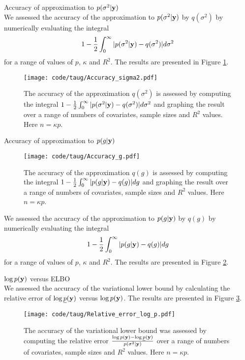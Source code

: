 \documentclass{amsart}[12pt]
\begin{document}
Accuracy of approximation to $p(\sigma^2 | {\bf y})$ \\

We assessed the accuracy of the approximation to $p(\sigma^2 | {\bf y})$ by $q(\sigma^2)$ by numerically evaluating
the integral
\[
	1 - \frac{1}{2} \int_0^\infty |p(\sigma^2 | {\bf y}) - q(\sigma^2)| d \sigma^2
\]
for a range of values of $p$, $\kappa$ and $R^2$. The results are presented in Figure \ref{fig:accuracy_sigma2}.

\begin{figure}[p]
	\texttt{[image: code/taug/Accuracy\_sigma2.pdf]}
	\caption{The accuracy of the approximation $q(\sigma^2)$ is assessed by computing the integral   $1 -
		\frac{1}{2} \int_0^\infty |p(\sigma^2 | {\bf y}) - q(\sigma^2)| d \sigma^2$ and graphing the result over a range
	of numbers of covariates, sample sizes and $R^2$  values. Here $n = \kappa p$.}
	\label{fig:accuracy_sigma2}
\end{figure}

Accuracy of approximation to $p(g | {\bf y})$ \\

\begin{figure}[p]
	\texttt{[image: code/taug/Accuracy\_g.pdf]}
	\caption{The accuracy of the approximation $q(g)$ is assessed by computing the integral   $1 -
		\frac{1}{2} \int_0^\infty |p(g | {\bf y}) - q(g)| d g$ and graphing the result over a range
	of numbers of covariates, sample sizes and $R^2$  values. Here $n = \kappa p$.}
	\label{fig:accuracy_g}
\end{figure}

We assessed the accuracy of the approximation to $p(g | {\bf y})$ by $q(g)$ by numerically evaluating the integral
\[
	1 - \frac{1}{2} \int_0^\infty |p(g | {\bf y}) - q(g)| d g
\]
for a range of values of $p$, $\kappa$ and $R^2$. The results are presented in Figure \ref{fig:accuracy_g}.


$\log{p({\bf y})}$ versus ELBO \\

We assessed the accuracy of the variational lower bound by calculating the relative error of
$\log{\underline{p}({\bf y})}$ versus $\log{p({\bf y})}$. The results are presented in Figure
\ref{fig:relative_error}.

\begin{figure}[p]
	\texttt{[image: code/taug/Relative\_error\_log\_p.pdf]}
	\caption{The accuracy of the variational lower bound was assessed by computing the relative error
						$\frac{\log p({\bf y}) - \log \underline{p}({\bf y})}{p(\sigma^2 | {\bf y})}$ over a range
	of numbers of covariates, sample sizes and $R^2$  values. Here $n = \kappa p$.}
	\label{fig:relative_error}
\end{figure}
\end{document}
